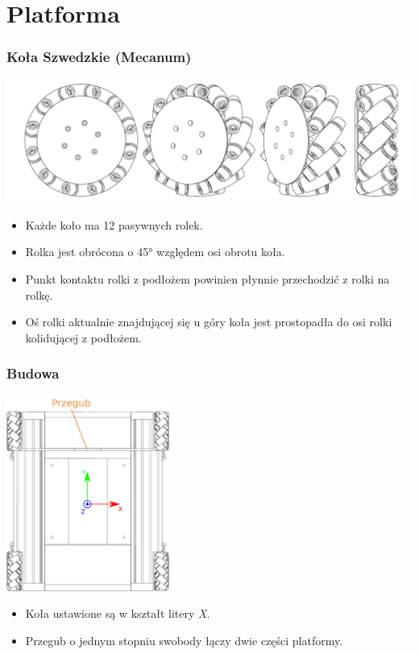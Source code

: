 \documentclass{beamer}
\begin{document}
	\section{Platforma}
	\begin{frame}
		\frametitle{Koła Szwedzkie (Mecanum)}
		\centering
		\includegraphics[width=\textwidth]{graphics/wheel.pdf}
		\begin{itemize}
			\item Każde koło ma 12 pasywnych rolek.
			\item Rolka jest obrócona o 45° względem osi obrotu koła.
			\item Punkt kontaktu rolki z podłożem powinien płynnie przechodzić z rolki na rolkę.
			\item Oś rolki aktualnie znajdującej się u góry koła jest prostopadła do osi rolki kolidującej z podłożem.
		\end{itemize}
	\end{frame}
	
	\begin{frame}
		\frametitle{Budowa}
		\centering
		\includegraphics[width=0.4\textwidth]{graphics/base.pdf}
		\begin{itemize}
			\item Koła ustawione są w kształt litery \emph{X}.
			\item Przegub o jednym stopniu swobody łączy dwie części platformy.
		\end{itemize}
	\end{frame}
	
\end{document}
